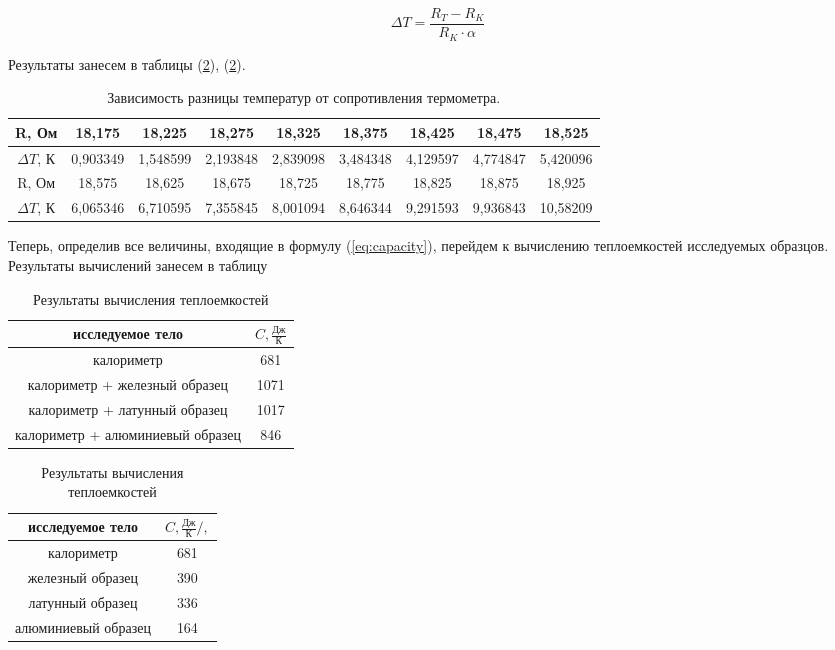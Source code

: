 \documentclass[12pt,a4paper]{article}
\begin{document}
	\begin{equation}
		\Delta T = \frac{R_{T} - R_{K}}{R_{K} \cdot \alpha}
	\end{equation}
	
	Результаты занесем в таблицы (\ref{tab:first_results_for_capacity}), (\ref{tab:first_results_for_capacity}).
	
	\begin{table}[h!]
		\centering
		\begin{tabular}{|c||c|c|c|c|c|c|c|c|}
		\hline
		R, Ом         & 18,175   & 18,225   & 18,275   & 18,325   & 18,375   & 18,425   & 18,475   & 18,525   \\ \hline
		$\Delta T$, К & 0,903349 & 1,548599 & 2,193848 & 2,839098 & 3,484348 & 4,129597 & 4,774847 & 5,420096 \\ \hline \hline
		R, Ом         & 18,575   & 18,625   & 18,675   & 18,725   & 18,775   & 18,825   & 18,875   & 18,925   \\ \hline
		$\Delta T$, К & 6,065346 & 6,710595 & 7,355845 & 8,001094 & 8,646344 & 9,291593 & 9,936843 & 10,58209 \\ \hline
		\end{tabular}
		\caption{Зависимость разницы температур от сопротивления термометра.}
		\label{tab:diffrence_between_temperature}
	\end{table}
	
	Теперь, определив все величины, входящие в формулу (\ref{eq:capacity}), перейдем к вычислению теплоемкостей исследуемых образцов. Результаты вычислений занесем в таблицу
	
	\begin{table}[h!]
		\centering
		\begin{tabular}{|c|c|}
		\hline
		исследуемое тело                 & $C, \frac{\text{Дж}}{\text{К}}$  \\ \hline
		калориметр                       & 681 \\ \hline	
		калориметр + железный образец    & 1071 \\ \hline
		калориметр + латунный образец    & 1017 \\ \hline
		калориметр + алюминиевый образец & 846 \\ \hline
		\end{tabular}
		\caption{Результаты вычисления теплоемкостей}
		\label{tab:first_results_for_capacity}
	\end{table}
	
	\begin{table}[h!]
		\centering
		\begin{tabular}{|c|c|}
		\hline
		исследуемое тело                 & $C, \frac{\text{Дж}}{\text{К}}/, $  \\ \hline
		калориметр                       & 681 \\ \hline	
		железный образец  			     & 390 \\ \hline
		латунный образец   				 & 336 \\ \hline
		алюминиевый образец 			 & 164 \\ \hline
		\end{tabular}
		\caption{Результаты вычисления теплоемкостей}
		\label{tab:second_results_for_capacity}
	\end{table}
		
\end{document}

